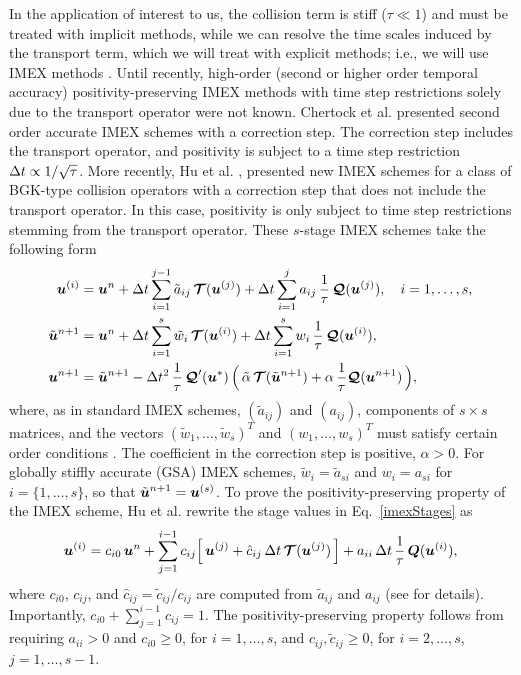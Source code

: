 In the application of interest to us, the collision term is stiff ($\tau\ll1$) and must be treated with implicit methods, while we can resolve the time scales induced by the transport term, which we will treat with explicit methods; i.e., we will use IMEX methods \cite{pareschiRusso_2005}.  
Until recently, high-order (second or higher order temporal accuracy) positivity-preserving IMEX methods with time step restrictions solely due to the transport operator were not known.  
Chertock et al. \cite{chertock_etal_2015} presented second order accurate IMEX schemes with a correction step.  
The correction step includes the transport operator, and positivity is subject to a time step restriction $\Delta t\propto1/\sqrt{\tau}$.  
More recently, Hu et al. \cite{hu_etal_2017}, presented new IMEX schemes for a class of BGK-type collision operators with a correction step that does not include the transport operator.  
In this case, positivity is only subject to time step restrictions stemming from the transport operator.  
These $s$-stage IMEX schemes take the following form \cite{hu_etal_2017}
\begin{align}
  \boldsymbol{u}^{(i)}
  &=\boldsymbol{u}^{n}
  +\Delta t\sum_{i=1}^{j-1}\tilde{a}_{ij}\,\boldsymbol{\mathcal{T}}(\boldsymbol{u}^{(j)})
  +\Delta t\sum_{i=1}^{j}a_{ij}\,\frac{1}{\tau}\,\boldsymbol{\mathcal{Q}}(\boldsymbol{u}^{(j)}),
  \quad i=1,\ldots,s, \label{imexStages} \\
  \tilde{\boldsymbol{u}}^{n+1}
  &=\boldsymbol{u}^{n}
  +\Delta t\sum_{i=1}^{s}\tilde{w}_{i}\,\boldsymbol{\mathcal{T}}(\boldsymbol{u}^{(i)})
  +\Delta t\sum_{i=1}^{s}w_{i}\,\frac{1}{\tau}\,\boldsymbol{\mathcal{Q}}(\boldsymbol{u}^{(i)}), \label{imexIntermediate} \\
  \boldsymbol{u}^{n+1}
  &=\tilde{\boldsymbol{u}}^{n+1}-\Delta t^{2}\,\frac{1}{\tau}\,\boldsymbol{\mathcal{Q}}'(\boldsymbol{u}^{*})\,\Big(\,\tilde{\alpha}\,\boldsymbol{\mathcal{T}}(\tilde{\boldsymbol{u}}^{n+1})+\alpha\,\frac{1}{\tau}\boldsymbol{\mathcal{Q}}(\boldsymbol{u}^{n+1})\,\Big), \label{eq:imexCorrection}
\end{align}
where, as in standard IMEX schemes, $(\tilde{a}_{ij})$ and $(a_{ij})$, components of $s\times s$ matrices, and the vectors $(\tilde{w}_{1},\ldots,\tilde{w}_{s})^{T}$ and $(w_{1},\ldots,w_{s})^{T}$ must satisfy certain order conditions \cite{pareschiRusso_2005}.  
The coefficient in the correction step is positive, $\alpha>0$.  
For globally stiffly accurate (GSA) IMEX schemes, $\tilde{w}_{i}=\tilde{a}_{si}$ and $w_{i}=a_{si}$ for $i=\{1,\ldots,s\}$, so that $\tilde{\boldsymbol{u}}^{n+1}=\boldsymbol{u}^{(s)}$.  
To prove the positivity-preserving property of the IMEX scheme, Hu et al. \cite{hu_etal_2017} rewrite the stage values in Eq.~\eqref{imexStages} as
\begin{equation}
  \boldsymbol{u}^{(i)}
  =c_{i0}\,\boldsymbol{u}^{n}+\sum_{j=1}^{i-1}c_{ij}\Big[\,\boldsymbol{u}^{(j)}+\hat{c}_{ij}\,\Delta t\,\boldsymbol{\mathcal{T}}(\boldsymbol{u}^{(j)})\,\Big]
  +a_{ii}\,\Delta t\,\frac{1}{\tau}\,\boldsymbol{Q}(\boldsymbol{u}^{(i)}),
  \label{eq:imexStagesRewrite}
\end{equation}
where $c_{i0}$, $c_{ij}$, and $\hat{c}_{ij}=\tilde{c}_{ij}/c_{ij}$ are computed from $\tilde{a}_{ij}$ and $a_{ij}$ (see \cite{hu_etal_2017} for details).  
Importantly, $c_{i0}+\sum_{j=1}^{i-1}c_{ij}=1$.  
The positivity-preserving property follows from requiring $a_{ii}>0$ and $c_{i0}\ge0$, for $i=1,\ldots,s$, and $c_{ij},\tilde{c}_{ij}\ge0$, for $i=2,\ldots,s$, $j=1,\ldots,s-1$.  
